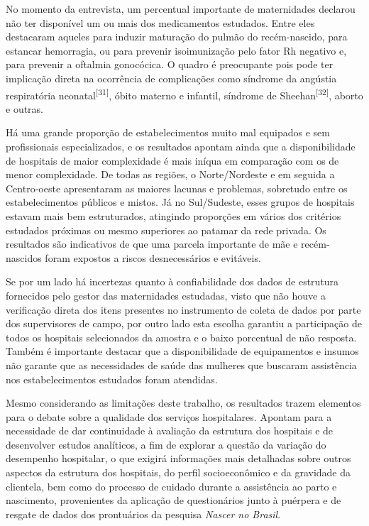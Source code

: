 \documentclass{article}
\begin{document}
No momento da entrevista, um percentual importante de maternidades declarou não
ter
disponível um ou mais dos medicamentos estudados. Entre eles destacaram aqueles
para
induzir maturação do pulmão do recém-nascido, para estancar hemorragia, ou para
prevenir isoimunização pelo fator Rh negativo e, para prevenir a oftalmia
gonocócica. O quadro é preocupante pois pode ter implicação direta na ocorrência
de
complicações como síndrome da angústia respiratória neonatal\textsuperscript{[}\textsuperscript{31}\textsuperscript{]}, óbito materno e infantil, síndrome de Sheehan\textsuperscript{[}\textsuperscript{32}\textsuperscript{]}, aborto e outras.

Há uma grande proporção de estabelecimentos muito mal equipados e sem
profissionais
especializados, e os resultados apontam ainda que a disponibilidade de hospitais
de
maior complexidade é mais iníqua em comparação com os de menor complexidade. De
todas as regiões, o Norte/Nordeste e em seguida a Centro-oeste apresentaram as
maiores lacunas e problemas, sobretudo entre os estabelecimentos públicos e
mistos.
Já no Sul/Sudeste, esses grupos de hospitais estavam mais bem estruturados,
atingindo proporções em vários dos critérios estudados próximas ou mesmo
superiores
ao patamar da rede privada. Os resultados são indicativos de que uma parcela
importante de mãe e recém- nascidos foram expostos a riscos desnecessários e
evitáveis.

Se por um lado há incertezas quanto à confiabilidade dos dados de estrutura
fornecidos pelo gestor das maternidades estudadas, visto que não houve a
verificação
direta dos itens presentes no instrumento de coleta de dados por parte dos
supervisores de campo, por outro lado esta escolha garantiu a participação de
todos
os hospitais selecionados da amostra e o baixo porcentual de não resposta.
Também é
importante destacar que a disponibilidade de equipamentos e insumos não garante
que
as necessidades de saúde das mulheres que buscaram assistência nos
estabelecimentos
estudados foram atendidas.

Mesmo considerando as limitações deste trabalho, os resultados trazem elementos
para
o debate sobre a qualidade dos serviços hospitalares. Apontam para a necessidade
de
dar continuidade à avaliação da estrutura dos hospitais e de desenvolver estudos
analíticos, a fim de explorar a questão da variação do desempenho hospitalar, o
que
exigirá informações mais detalhadas sobre outros aspectos da estrutura dos
hospitais, do perfil socioeconômico e da gravidade da clientela, bem como do
processo de cuidado durante a assistência ao parto e nascimento, provenientes da
aplicação de questionários junto à puérpera e de resgate de dados dos
prontuários da
pesquisa \textit{Nascer no Brasil}.
\end{document}
